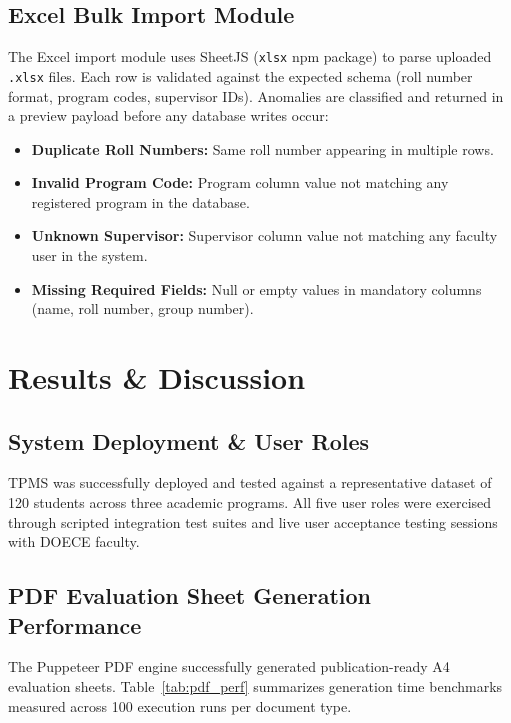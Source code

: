 \documentclass[12pt]{report}
\begin{document}
\section{Excel Bulk Import Module}

The Excel import module uses SheetJS (\texttt{xlsx} npm package) to parse uploaded \texttt{.xlsx} files. Each row is validated against the expected schema (roll number format, program codes, supervisor IDs). Anomalies are classified and returned in a preview payload before any database writes occur:

\begin{itemize}[leftmargin=*]
  \item \textbf{Duplicate Roll Numbers:} Same roll number appearing in multiple rows.
  \item \textbf{Invalid Program Code:} Program column value not matching any registered program in the database.
  \item \textbf{Unknown Supervisor:} Supervisor column value not matching any faculty user in the system.
  \item \textbf{Missing Required Fields:} Null or empty values in mandatory columns (name, roll number, group number).
\end{itemize}

\chapter{Results \& Discussion}

\section{System Deployment \& User Roles}

TPMS was successfully deployed and tested against a representative dataset of 120 students across three academic programs. All five user roles were exercised through scripted integration test suites and live user acceptance testing sessions with DOECE faculty.

\section{PDF Evaluation Sheet Generation Performance}

The Puppeteer PDF engine successfully generated publication-ready A4 evaluation sheets. Table~\ref{tab:pdf_perf} summarizes generation time benchmarks measured across 100 execution runs per document type.
\end{document}
